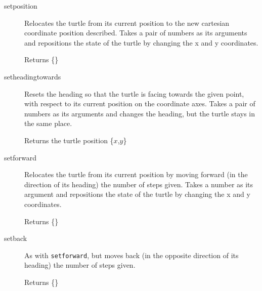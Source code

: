 \begin{description}
 \item[setposition] Relocates the turtle from its current position to the
       new cartesian coordinate position described. Takes a pair of
       numbers as its arguments and repositions the state of the turtle by
       changing the x and y coordinates.

       Returns \{\}


 \item[setheadingtowards] Resets the heading so that the turtle is facing
       towards the given point, with respect to its current position on
       the coordinate axes. Takes a pair of numbers as its arguments and
       changes the heading, but the turtle stays in the same place.

       Returns the turtle position \{$x$,$y$\}


 \item[setforward] Relocates the turtle from its current position by
       moving forward (in the direction of its heading) the number of
       steps given. Takes a number as its argument and repositions the
       state of the turtle by changing the x and y coordinates.

       Returns \{\}


 \item[setback] As with \texttt{setforward}, but moves back (in the opposite
       direction of its heading) the number of steps given.

       Returns \{\}


\end{description}

